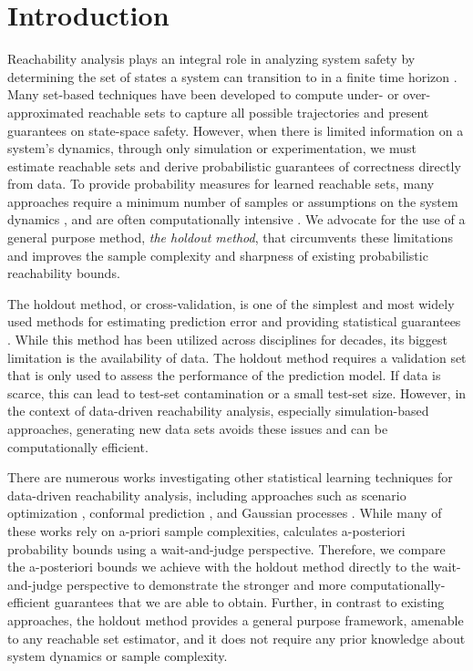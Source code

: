 \documentclass[letterpaper, 10 pt, conference]{ieeeconf}  %
\begin{document}
\section{Introduction}
Reachability analysis plays an integral role in analyzing system safety by determining the set of states a system can transition to in a finite time horizon \cite{althoff2010reachability}. Many set-based techniques \cite{10.1007/978-3-540-24743-2_32, annurev-control-060117-104941, annurev-control-071420-081941, 10.1007/978-3-540-31954-2_19} have been developed to compute under- or over-approximated reachable sets to capture all possible trajectories and present guarantees on state-space safety. However, when there is limited information on a system's dynamics, through only simulation or experimentation, we must estimate reachable sets and derive probabilistic guarantees of correctness directly from data. To provide probability measures for learned reachable sets, many approaches require a minimum number of samples \cite{pmlr-v120-devonport20a, 9147918, 8814354, 10138798} or assumptions on the system dynamics \cite{Lew2020SamplingbasedRA, 10383270, 10068731}, and are often computationally intensive \cite{10.1007/978-3-030-99524-9_17, 10.1109/CDC45484.2021.9682860}. We advocate for the use of a general purpose method, \textit{the holdout method}, that circumvents these limitations and improves the sample complexity and sharpness of existing probabilistic reachability bounds. 

The holdout method, or cross-validation, is one of the simplest and most widely used methods for estimating prediction error and providing statistical guarantees \cite{stone1974cross, Kohavi1995, hastie2009elements, tempobook}. While this method has been utilized across disciplines for decades, its biggest limitation is the availability of data. The holdout method requires a validation set that is only used to assess the performance of the prediction model. If data is scarce, this can lead to test-set contamination or a small test-set size. However, in the context of data-driven reachability analysis, especially simulation-based approaches, generating new data sets avoids these issues and can be computationally efficient.  

There are numerous works investigating other statistical learning techniques for data-driven reachability analysis, including approaches such as scenario optimization \cite{pmlr-v242-dietrich24a, pmlr-v242-lin24a, 8882241}, conformal prediction \cite{10384213, pmlr-v204-tebjou23a, 10383723}, and Gaussian processes \cite{10383270, 7039601}. While many of these works rely on a-priori sample complexities, \cite{pmlr-v242-dietrich24a} calculates a-posteriori probability bounds using a wait-and-judge perspective. Therefore, we compare the a-posteriori bounds we achieve with the holdout method directly to the wait-and-judge perspective to demonstrate the stronger and more computationally-efficient guarantees that we are able to obtain. Further, in contrast to existing approaches, the holdout method provides a general purpose framework, amenable to any reachable set estimator, and it does not require any prior knowledge about system dynamics or sample complexity. 
\end{document}
